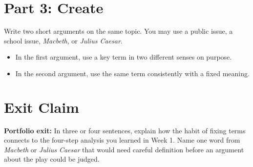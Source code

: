 \documentclass[12pt]{article}
\begin{document}
\section*{Part 3: Create}
Write two short arguments on the same topic. You may use a public issue, a school issue, \textit{Macbeth}, or \textit{Julius Caesar}.

\begin{itemize}[leftmargin=*]
\item In the first argument, use a key term in two different senses on purpose.
\item In the second argument, use the same term consistently with a fixed meaning.
\end{itemize}

\vspace{3cm}

\section*{Exit Claim}
\textbf{Portfolio exit:} In three or four sentences, explain how the habit of fixing terms connects to the four-step analysis you learned in Week 1. Name one word from \textit{Macbeth} or \textit{Julius Caesar} that would need careful definition before an argument about the play could be judged.

\vspace{2cm}
\end{document}
